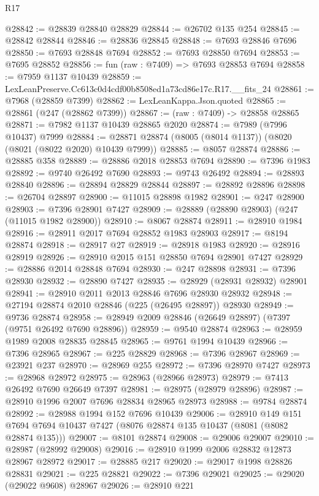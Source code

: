 \begin{lexlean}{R17}
\begin{coremodule}
@28842 := @28839 @28840 @28829
@28844 := @26702 @135 @254
@28845 := @28842 @28844
@28846 := @28836 @28845
@28848 := @7693 @28846 @7696
@28850 := @7693 @28848 @7694
@28852 := @7693 @28850 @7694
@28853 := @7695 @28852
@28856 := fun (raw : @7409) => @7693 @28853 @7694
@28858 := @7959 @1137 @10439
@28859 := LexLeanPreserve.Cc613c0d4cdf00b8508ed1a73cd86e17c.R17.__fits_24
@28861 := @7968 (@28859 @7399)
@28862 := LexLeanKappa.Json.quoted
@28865 := @28861 (@247 (@28862 @7399))
@28867 := (raw : @7409) -> @28858 @28865
@28871 := @7982 @1137 @10439 @28865 @2020
@28874 := @7989 (@7996 @10437) @7999
@28884 := @28871 @28874 (@8005 (@8014 @1137)) (@8020 (@8021 (@8022 @2020) @10439 @7999))
@28885 := @8057 @28874
@28886 := @28885 @358
@28889 := @28886 @2018 @28853 @7694
@28890 := @7396 @1983
@28892 := @9740 @26492 @7690
@28893 := @9743 @26492
@28894 := @28893 @28840
@28896 := @28894 @28829 @28844
@28897 := @28892 @28896
@28898 := @26704 @28897
@28900 := @11015 @28898 @1982
@28901 := @247 @28900
@28903 := @7396 @28901 @7427
@28909 := @28889 (@28890 @28903) (@247 (@11015 @1982 @28900))
@28910 := @8067 @28874
@28911 := @28910 @1984
@28916 := @28911 @2017 @7694 @28852 @1983 @28903
@28917 := @8194 @28874
@28918 := @28917 @27
@28919 := @28918 @1983
@28920 := @28916 @28919
@28926 := @28910 @2015 @151 @28850 @7694 @28901 @7427
@28929 := @28886 @2014 @28848 @7694
@28930 := @247 @28898
@28931 := @7396 @28930
@28932 := @28890 @7427
@28935 := @28929 (@28931 @28932) @28901
@28941 := @28910 @2011 @2013 @28846 @7696 @28930 @28932
@28948 := @27194 @28874 @2010 @28846 (@225 (@26495 @28897)) @28930
@28949 := @9736 @28874
@28958 := @28949 @2009 @28846 (@26649 @28897) (@7397 (@9751 @26492 @7690 @28896))
@28959 := @9540 @28874
@28963 := @28959 @1989 @2008 @28835 @28845
@28965 := @9761 @1994 @10439
@28966 := @7396 @28965
@28967 := @225 @28829
@28968 := @7396 @28967
@28969 := @23921 @237
@28970 := @28969 @255
@28972 := @7396 @28970 @7427
@28973 := @28968 @28972
@28975 := @28963 (@28966 @28973)
@28979 := @7413 @26492 @7690 @26649 @7397
@28981 := @28975 (@28979 @28896)
@28987 := @28910 @1996 @2007 @7696 @28834 @28965 @28973
@28988 := @9784 @28874
@28992 := @28988 @1994 @152 @7696 @10439
@29006 := @28910
    @149
    @151
    @7694
    @7694
    @10437
    @7427
    (@8076 @28874 @135 @10437 (@8081 (@8082 @28874 @135)))
@29007 := @8101 @28874
@29008 := @29006 @29007
@29010 := @28987 (@28992 @29008)
@29016 := @28910 @1999 @2006 @28832 @12873 @28967 @28972
@29017 := @28885 @217
@29020 := @29017 @1998 @28826 @28831
@29021 := @225 @28821
@29022 := @7396 @29021
@29025 := @29020 (@29022 @9608) @28967
@29026 := @28910 @221

\end{coremodule}
\end{lexlean}
